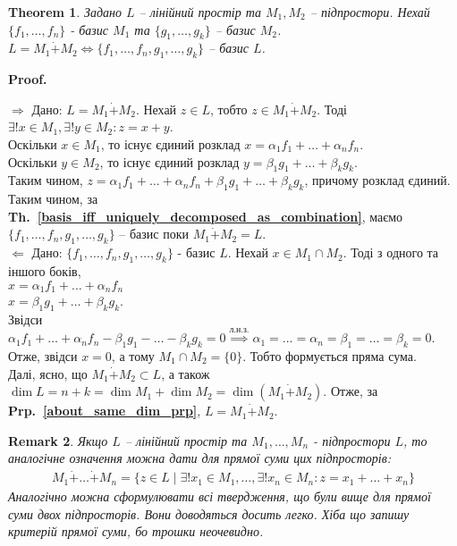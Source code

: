 \documentclass[a4paper, 10pt]{article}
\makeatletter
\def\rightproof{$\boxed{\Rightarrow}$ }
\def\leftproof{$\boxed{\Leftarrow}$ }
\theoremstyle{theoremdd}
\newtheorem{theorem}{Theorem}[subsection]
\newtheorem{remark}[theorem]{Remark}
\newcommand\thref[1]{\textbf{Th.~\ref{#1}}}
\newcommand\prpref[1]{\textbf{Prp.~\ref{#1}}}
\renewenvironment{proof}[1][Proof.\\]{\par
\pushQED{\hfill \qed}%
\normalfont \topsep6\p@\@plus6\p@\relax
\trivlist
\item\relax
{\bfseries
#1\@addpunct{.}}\hspace\labelsep\ignorespaces
}{%
\popQED\endtrivlist\@endpefalse
}
\makeatother
\begin{document}
	\begin{theorem}
	\label{direct_sum_iff_union_of_bases_is_basis}
	Задано $L$ -- лінійний простір та $M_1,M_2$ -- підпростори. Нехай $\{f_1,\dots,f_n\}$ - базис $M_1$ та $\{g_1,\dots,g_k\}$ -- базис $M_2$.\\
	$L = M_1 \dot{+} M_2 \iff \{f_1,\dots,f_n,g_1,\dots,g_k\}$ -- базис $L$.
	\end{theorem}
	
	\begin{proof}
	\rightproof Дано: $L = M_1 \dot{+} M_2$. Нехай $z \in L$, тобто $z \in M_1 \dot{+} M_2$. Тоді $\exists! x \in M_1, \exists! y \in M_2: z = x+y$.\\
	Оскільки $x \in M_1$, то існує єдиний розклад $x = \alpha_1 f_1 + \dots + \alpha_n f_n$.\\
	Оскільки $y \in M_2$, то існує єдиний розклад $y = \beta_1 g_1 + \dots + \beta_k g_k$.\\
	Таким чином, $z = \alpha_1 f_1 + \dots + \alpha_n f_n + \beta_1 g_1 + \dots + \beta_k g_k$, причому розклад єдиний. Таким чином, за \thref{basis_iff_uniquely_decomposed_as_combination}, маємо $\{f_1,\dots,f_n,g_1,\dots,g_k\}$ -- базис поки $M_1 \dot{+} M_2 = L$. 
	\bigskip \\
	\leftproof Дано: $\{f_1,\dots,f_n,g_1,\dots,g_k\}$ - базис $L$.
	Нехай $x \in M_1 \cap M_2$. Тоді з одного та іншого боків,\\
	$x = \alpha_1 f_1 + \dots + \alpha_n f_n$\\
	$x = \beta_1 g_1 + \dots + \beta_k g_k$.\\
	Звідси $\alpha_1 f_1 + \dots + \alpha_n f_n - \beta_1 g_1 - \dots - \beta_k g_k = 0 \overset{\text{л.н.з.}}{\implies} \alpha_1 = \dots = \alpha_n = \beta_1 = \dots = \beta_k = 0$.\\
	Отже, звідси $x = 0$, а тому $M_1 \cap M_2 = \{0\}$. Тобто формується пряма сума.\\
	Далі, ясно, що $M_1 \dot{+} M_2 \subset L$, а також $\dim L = n+k = \dim M_1 + \dim M_2 = \dim (M_1 \dot{+} M_2)$. Отже, за \prpref{about_same_dim_prp}, $L = M_1 \dot{+} M_2$.
	\end{proof}
	
	\begin{remark}
	Якщо $L$ -- лінійний простір та $M_1,\dots,M_n$ - підпростори $L$, то аналогічне означення можна дати для прямої суми цих підпросторів:
	\begin{align*}
M_1 \dot{+} \dots \dot{+} M_n = \{z \in L \mid \exists !x_1 \in M_1, \dots, \exists! x_n \in M_n: z = x_1 + \dots + x_n\}
	\end{align*}
	Аналогічно можна сформулювати всі твердження, що були вище для прямої суми двох підпросторів. Вони доводяться досить легко. Хіба що запишу критерій прямої суми, бо трошки неочевидно.
	\end{remark}
	
\end{document}
